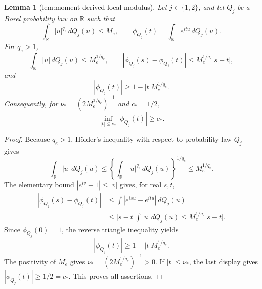 \documentclass{article}
\newtheorem{lemma}{Lemma}
\begin{document}
\begin{lemma}[lem:moment-derived-local-modulus]\label{lem:moment-derived-local-modulus}
Let \(j\in\{1,2\}\), and let \(Q_j\) be a Borel probability law on
\(\mathbb R\) such that
\[
 \int_{\mathbb R}|u|^{q_e}\,dQ_j(u)\le M_e,
 \qquad
 \phi_{Q_j}(t)=\int_{\mathbb R}e^{itu}\,dQ_j(u).
\]
For \(q_e>1\),
\[
 \int_{\mathbb R}|u|\,dQ_j(u)\le M_e^{1/q_e},
 \qquad
 |\phi_{Q_j}(s)-\phi_{Q_j}(t)|
 \le M_e^{1/q_e}|s-t|,
\]
and
\[
 |\phi_{Q_j}(t)|\ge1-|t|M_e^{1/q_e}.
\]
Consequently, for \(\nu_*=(2M_e^{1/q_e})^{-1}\) and \(c_*=1/2\),
\[
 \inf_{|t|\le\nu_*}|\phi_{Q_j}(t)|\ge c_*.
\]
\end{lemma}
\begin{proof}
Because \(q_e>1\), H\"older's inequality with respect to probability law \(Q_j\) gives
\[
 \int_{\mathbb R}|u|\,dQ_j(u)
 \le\left\{\int_{\mathbb R}|u|^{q_e}\,dQ_j(u)\right\}^{1/q_e}
 \le M_e^{1/q_e}.
\]
The elementary bound \(|e^{iv}-1|\le|v|\) gives, for real \(s,t\),
\[
 \begin{aligned}
 |\phi_{Q_j}(s)-\phi_{Q_j}(t)|
 &\le\int|e^{isu}-e^{itu}|\,dQ_j(u)\\
 &\le|s-t|\int|u|\,dQ_j(u)
 \le M_e^{1/q_e}|s-t|.
 \end{aligned}
\]
Since \(\phi_{Q_j}(0)=1\), the reverse triangle inequality yields
\[
 |\phi_{Q_j}(t)|\ge1-|t|M_e^{1/q_e}.
\]
The positivity of \(M_e\) gives \(\nu_*=(2M_e^{1/q_e})^{-1}>0\). If \(|t|\le\nu_*\), the last display gives \(|\phi_{Q_j}(t)|\ge1/2=c_*\). This proves all assertions.
\end{proof}
\end{document}
